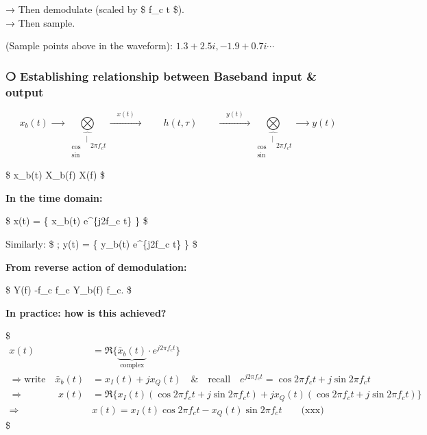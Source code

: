 \documentclass[11pt]{article}
\begin{document}
{→ Then demodulate (scaled by \$ \approx {} \pi f\_c t \$).\\
→ Then sample.

(Sample points above in the waveform):
\(1.3 + 2.5i, -1.9 + 0.7i \cdots\)

    \subsubsection{❍ Establishing relationship between Baseband input \&
output}\label{establishing-relationship-between-baseband-input-output}

\[
x_b(t) \xrightarrow{\qquad } 
\underset{\hat{
\begin{matrix}
  & | \\
  \cos \\
  \sin
\end{matrix} 2\pi f_c t}
}{\bigotimes}
\xrightarrow{\quad x(t) \quad }  \boxed{\qquad h(t, \tau) \qquad } \xrightarrow{ \quad y(t) \quad } 
\underset{\hat{
\begin{matrix}
  & | \\
  \cos \\
  \sin
\end{matrix} 2\pi f_c t}
}{\bigotimes}
\xrightarrow{\qquad } y(t)
\]

\$ x\_b(t)  X\_b(f)
\xrightarrow{\qquad \qquad \qquad \qquad \qquad \qquad \qquad \qquad}
X(f) \$

\textbf{In the time domain:}

\$ \qquad \qquad x(t) = \Re \left\{ x\_b(t) \cdot e\^{}\{j2\pi f\_c t\}
\right\} \$

Similarly: \$ ; y(t) = \Re \left\{ y\_b(t) \cdot e\^{}\{j2\pi f\_c t\}
\right\} \$

\textbf{From reverse action of demodulation:}

\$ Y(f) \quad {} -f\_c
 f\_c\text{)} \quad \to \quad Y\_b(f)
\quad {} f\_c\text{)}. \$

    \textbf{In practice: how is this achieved?}

\$ \begin{align}
x(t) &= \Re \{ \underbrace{\bar{x}_b(t)}_{\text{complex}} \cdot e^{j 2 \pi f_c t} \} \\
\Rightarrow \text{write} \quad \bar{x}_b(t) &= x_I(t) + j x_Q(t) \quad \& \quad \text{recall} \quad e^{j 2 \pi f_c t} = \cos 2 \pi f_c t + j \sin 2 \pi f_c t \\
\Rightarrow \qquad \quad \; \; x(t) &= \Re \{ x_I(t) (\cos 2 \pi f_c t + j \sin 2 \pi f_c t) + j x_Q(t) (\cos 2 \pi f_c t + j \sin 2 \pi f_c t) \} \\
\Rightarrow \qquad \qquad \qquad \! & \boxed{x(t) = x_I(t) \cos 2 \pi f_c t - x_Q(t) \sin 2 \pi f_c t} \qquad \text{(xxx)}
\end{align} \$

}
\end{document}
